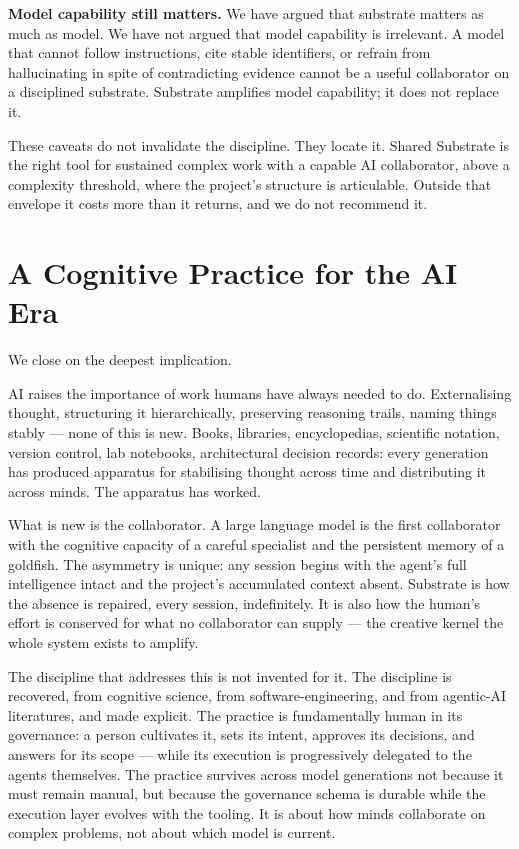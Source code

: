 \documentclass[11pt,a4paper,twocolumn]{article}
\begin{document}
\textbf{Model capability still matters.} We have argued that
substrate matters as much as model. We have not argued that model
capability is irrelevant. A model that cannot follow instructions,
cite stable identifiers, or refrain from hallucinating in spite of
contradicting evidence cannot be a useful collaborator on a
disciplined substrate. Substrate amplifies model capability; it
does not replace it.

These caveats do not invalidate the discipline. They locate it.
Shared Substrate is the right tool for sustained complex
work with a capable AI collaborator, above a complexity threshold,
where the project's structure is articulable. Outside that
envelope it costs more than it returns, and we do not recommend
it.

\section{A Cognitive Practice for the AI Era}
\label{sec:close}

We close on the deepest implication.

AI raises the importance of work humans have always needed to do.
Externalising thought, structuring it hierarchically, preserving
reasoning trails, naming things stably --- none of this is new.
Books, libraries, encyclopedias, scientific notation, version
control, lab notebooks, architectural decision records: every
generation has produced apparatus for stabilising thought across
time and distributing it across minds. The apparatus has worked.

What is new is the collaborator. A large language model is the
first collaborator with the cognitive capacity of a careful
specialist and the persistent memory of a goldfish. The asymmetry
is unique: any session begins with the agent's full intelligence
intact and the project's accumulated context absent. Substrate is
how the absence is repaired, every session, indefinitely. It is
also how the human's effort is conserved for what no collaborator
can supply --- the creative kernel the whole system exists to
amplify.

The discipline that addresses this is not invented for it. The
discipline is recovered, from cognitive science, from
software-engineering, and from agentic-AI literatures, and made
explicit. The practice is fundamentally human in its governance:
a person cultivates it, sets its intent, approves its decisions,
and answers for its scope --- while its execution is
progressively delegated to the agents themselves. The practice
survives across model generations not because it must remain
manual, but because the governance schema is durable while the
execution layer evolves with the tooling. It is about how minds
collaborate on complex problems, not about which model is
current.
\end{document}
